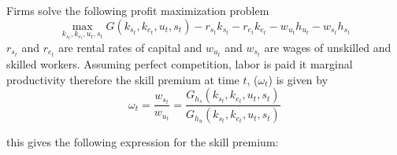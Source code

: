 \documentclass[12pt]{article}
\begin{document}
Firms solve the following profit maximization problem 
\begin{equation}\label{eq:profit_max}
 \max_{k_{s_t}, k_{e_t}, u_t, s_t} G(k_{s_t}, k_{e_t}, u_t, s_t) - r_{s_t}k_{s_t} - r_{e_t}k_{e_t} - w_{u_t} h_{u_t} - w_{s_t} h_{s_t}
\end{equation}
$r_{s_t}$ and $r_{e_t}$ are rental rates of capital and $w_{u_t}$ and $w_{s_t}$ are wages of unskilled and skilled workers. Assuming perfect competition, labor is paid it marginal productivity therefore the skill premium at time $t$, ($\omega_t$) is given by
\begin{equation}
 \omega_t = \frac{w_{s_t}}{w_{u_t}} = \frac{G_{h_s}(k_{s_t}, k_{e_t}, u_t, s_t) }{G_{h_u}(k_{s_t}, k_{e_t}, u_t, s_t) }
\end{equation}

this gives the following expression for the skill premium:
\end{document}
